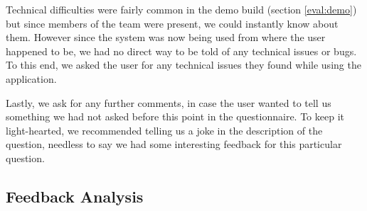 Technical difficulties were fairly common in the demo build (section
\ref{eval:demo}) but since members of the team were present, we could
instantly know about them.
However since the system was now being used from where the user
happened to be, we had no direct way to be told of any technical
issues or bugs.
To this end, we asked the user for any technical issues they found
while using the application.

Lastly, we ask for any further comments, in case the user wanted to
tell us something we had not asked before this point in the
questionnaire.
To keep it light-hearted, we recommended telling us a joke in the
description of the question, needless to say we had some interesting
feedback for this particular question.

\subsection{Feedback Analysis}

